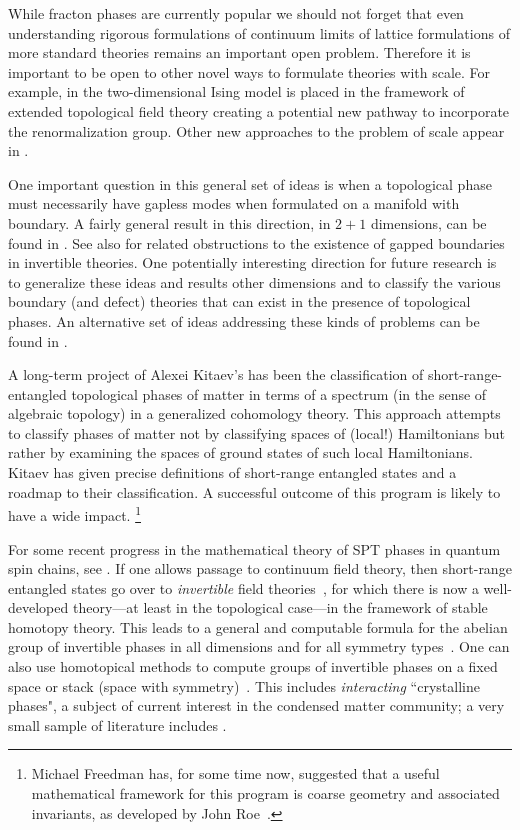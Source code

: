 \documentclass[12pt]{article}
\begin{document}
While fracton phases are currently popular we should not forget that even understanding rigorous formulations of continuum
limits of lattice formulations of more standard theories remains
an important open problem. Therefore it is important to be open to
other novel ways to formulate theories with scale. For example, in \cite{Freed:2018cec} the two-dimensional Ising model is placed in the framework of extended topological field theory creating a potential new pathway to incorporate the renormalization group. Other new approaches to the problem of scale appear in   \cite{Elliott:2017ahb,Grady:2021kii}.


One important question in this general set of ideas 
is when a topological phase must necessarily
have gapless modes when formulated on a manifold with boundary.
A  fairly general result in this direction, in $2+1$ dimensions,
can be found in \cite{Freed:2020qfy,Kaidi:2021gbs}. 
See also \cite{Cordova:2019bsd} for related obstructions to the 
existence of gapped boundaries in invertible theories. One potentially 
interesting direction for   future research is to generalize these ideas and 
results other dimensions 
and to classify the various boundary (and defect) 
theories that can exist in the presence of topological phases.  
An alternative set of ideas addressing these kinds of problems can be found in 
\cite{Prodan-Schulz-Baldes}.


A long-term project of Alexei Kitaev's has been the classification
of short-range-entangled topological phases of matter in terms of a
spectrum (in the sense of algebraic topology)
in a generalized cohomology theory. This approach attempts
to classify phases of matter not by classifying spaces of (local!)
Hamiltonians but rather by examining the spaces of ground states of
such local Hamiltonians. Kitaev has given precise definitions of
short-range entangled states and a roadmap to their classification.
A successful outcome of this program is likely to have a wide impact. 
%
\footnote{Michael Freedman has, for some time now, suggested that a useful mathematical framework for
this program is coarse geometry and associated invariants, as developed by
John Roe~\cite{Roe1,Roe2,RoeHigson}.}
%


For some recent progress in the mathematical theory of SPT phases in quantum spin chains, see \cite{Ogata}.
If one allows passage to continuum field theory, then short-range entangled states go over to \emph{invertible} field theories~\cite{Freed:2014eja}, for which there is now a well-developed theory---at least in the topological case---in the framework of stable homotopy theory.  This leads to a general and computable formula for the abelian group of invertible phases in all dimensions and for all symmetry types~\cite{Freed:2016rqq,Kapustin:2014tfa,Yonekura:2018ufj}.  One can also use homotopical methods to compute groups of invertible phases on a fixed space or stack (space with symmetry)~\cite{Shiozaki:2018yyj,Freed:2019jzd,Debray}.  This includes \emph{interacting} ``crystalline phases", a subject of current interest in the condensed matter community; a very small sample of literature includes \cite{Thorngren:2016hdm,Else:2018eas}.
\end{document}
